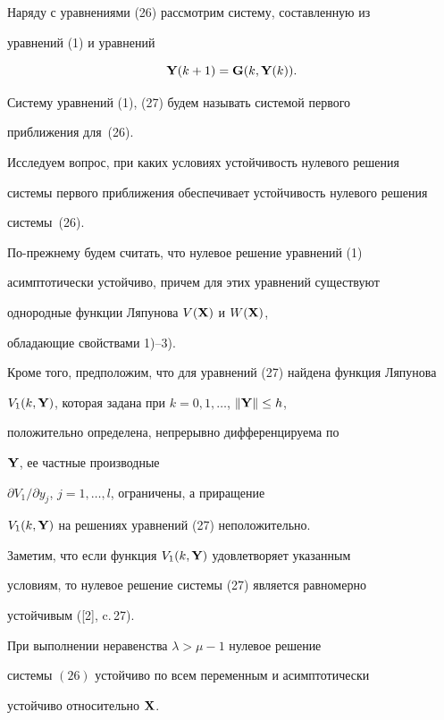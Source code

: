 Наряду с уравнениями (26) рассмотрим систему, составленную из


уравнений (1) и уравнений


\begin{equation}


\bold Y(k+1)=\bold G(k,\bold Y(k)).


\end{equation}


Систему уравнений (1), (27) будем называть системой первого


приближения для~(26).





Исследуем вопрос, при каких условиях устойчивость нулевого решения


системы первого приближения обеспечивает устойчивость нулевого решения


системы~(26).





По-прежнему будем считать, что нулевое решение уравнений (1)


асимптотически устойчиво, причем для этих уравнений существуют


однородные функции Ляпунова $V(\bold X)$ и $W(\bold X)$,


обладающие свойствами 1)--3).


Кроме того, предположим, что для уравнений (27) найдена функция Ляпунова


$V_1(k,\bold Y)$, которая задана при $k=0,1,\dotsc$, $\|\bold Y\|\leq h$,


положительно определена, непрерывно дифференцируема по


$\bold Y$, ее частные производные


$\partial V_1/\partial y_j$, $j=1,\dotsc,l$, ограничены, а приращение


$V_1(k,\bold Y)$ на решениях уравнений (27) неположительно.


Заметим, что если функция $V_1(k,\bold Y)$ удовлетворяет указанным


условиям, то нулевое решение системы (27) является равномерно


устойчивым ([2], c.\,27).





\begin{thm}


При выполнении неравенства $\lambda> \mu-1$ нулевое решение 


системы $(26)$ устойчиво по всем переменным и асимптотически


устойчиво относительно $\bold X$.


\end{thm}





